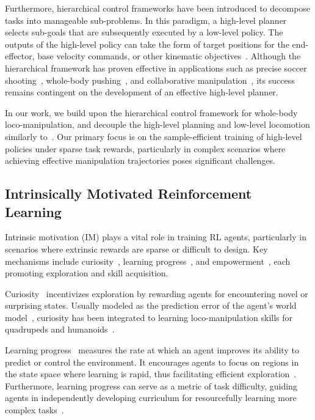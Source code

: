 Furthermore, hierarchical control frameworks have been introduced to decompose tasks into manageable sub-problems. 
In this paradigm, a high-level planner selects sub-goals that are subsequently executed by a low-level policy.
The outputs of the high-level policy can take the form of target positions for the end-effector, base velocity commands, or other kinematic objectives~\cite{rigo2024hierarchical, kumar2023cascaded, wang2024hypermotion}.
Although the hierarchical framework has proven effective in applications such as precise soccer shooting~\cite{ji2022hierarchical}, whole-body pushing~\cite{jeon2023learning}, and collaborative manipulation~\cite{nachum2020multi}, its success remains contingent on the development of an effective high-level planner.

In our work, we build upon the hierarchical control framework for whole-body loco-manipulation, and decouple the high-level planning and low-level locomotion similarly to~\citet{jeon2023learning}. 
Our primary focus is on the sample-efficient training of high-level policies under sparse task rewards, particularly in complex scenarios where achieving effective manipulation trajectories poses significant challenges.

\subsection{Intrinsically Motivated Reinforcement Learning}
Intrinsic motivation (IM) \citep{rm2000intrinsic} plays a vital role in training RL agents, particularly in scenarios where extrinsic rewards are sparse or difficult to design.
Key mechanisms include curiosity~\cite{schmidhuber1991possibility}, 
learning progress~\cite{schmidhuber2010formal}, and empowerment~\cite{klyubin2005empowerment}, each promoting exploration and skill acquisition. 

Curiosity~\cite{schmidhuber1991possibility} incentivizes exploration by rewarding agents for encountering novel or surprising states. 
Usually modeled as the prediction error of the agent's world model~\cite{pathak2017curiosity, pathak2019self, burda2019exploration}, 
curiosity has been integrated to learning loco-manipulation skills for quadrupeds and humanoids~\cite{schwarke2023curiosity, zhang2024wococo}.

Learning progress~\cite{schmidhuber2010formal} measures the rate at which an agent improves its ability to predict or control the environment.
It encourages agents to focus on regions in the state space where learning is rapid, thus facilitating efficient exploration~\cite{blaes2019control}. 
Furthermore, learning progress can serve as a metric of task difficulty, guiding agents in independently developing curriculum for resourcefully learning more complex tasks~\cite{colas2019curious}.


